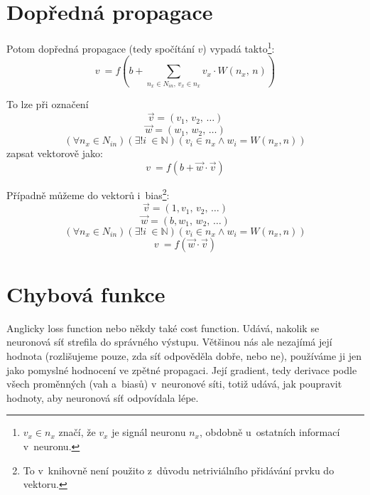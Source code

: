 \documentclass[12pt]{report}			%
\newcommand{\N}{\mathbb{N}}   			%
\begin{document}
				\section{Dopředná propagace}					
					Potom dopředná propagace (tedy spočítání $v$) vypadá takto\footnote{$v_x \in n_x$ značí, že $v_x$ je signál neuronu $n_x$, obdobně u~ostatních informací v~neuronu.}:
					\begin{equation} v~= f\left(b + \sum_{n_x \in N_{in},\,v_x \in n_x} v_x \cdot W\left(n_x,\,n\right) \right) \label{eq:v} \end{equation}
				
					To lze při označení
					\begin{equation} \vec{v} = \left(v_{1},\,v_{2},\,\ldots\right) \label{eq:v2} \end{equation}
					\begin{equation} \vec{w} = \left(w_{1},\,w_{2},\,\ldots\right) \end{equation}
					\begin{equation} \left(\forall n_x \in N_{in}\right)\left(\exists! i~\in \N\right)\left(v_i \in n_x \land w_i = W(n_x, n)\right) \end{equation}
					zapsat vektorově jako:
					\begin{equation} v~= f\left(b + \vec{w} \cdot \vec{v} \right) \label{eq:fp} \end{equation}
				
					Případně můžeme do vektorů  i~bias\footnote{To v~knihovně není použito z~důvodu netriviálního přidávání prvku do vektoru.}:
					\begin{equation} \vec{v} = \left(1, v_{1},\,v_{2},\,\ldots\right) \end{equation}
					\begin{equation} \vec{w} = \left(b, w_{1},\,w_{2},\,\ldots\right) \end{equation}
					\begin{equation} \left(\forall n_x \in N_{in}\right)\left(\exists! i~\in \N\right)\left(v_i \in n_x \land w_i = W(n_x, n)\right) \end{equation}
					\begin{equation} v~= f\left(\vec{w} \cdot \vec{v} \right) \label{eq:fpb} \end{equation}
					
				\section{Chybová funkce}
					Anglicky loss function nebo někdy také cost function. Udává, nakolik se neuronová síť strefila do správného výstupu. Většinou nás ale nezajímá její hodnota (rozlišujeme pouze, zda síť odpověděla dobře, nebo ne), používáme ji jen jako pomyslné hodnocení ve zpětné propagaci. Její \gls{gradient}, tedy derivace podle všech proměnných (vah a~biasů) v~neuronové síti, totiž udává, jak poupravit hodnoty, aby neuronová síť odpovídala lépe.
				
\end{document}
